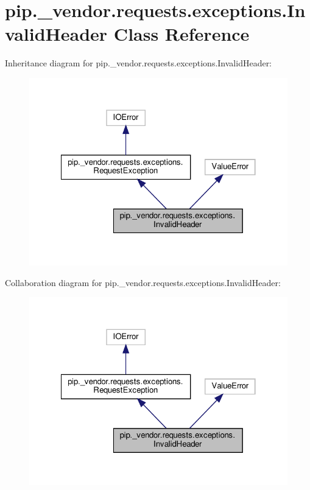 \hypertarget{classpip_1_1__vendor_1_1requests_1_1exceptions_1_1InvalidHeader}{}\section{pip.\+\_\+vendor.\+requests.\+exceptions.\+Invalid\+Header Class Reference}
\label{classpip_1_1__vendor_1_1requests_1_1exceptions_1_1InvalidHeader}


Inheritance diagram for pip.\+\_\+vendor.\+requests.\+exceptions.\+Invalid\+Header\+:
\nopagebreak
\begin{figure}[H]
\begin{center}
\leavevmode
\includegraphics[width=322pt]{classpip_1_1__vendor_1_1requests_1_1exceptions_1_1InvalidHeader__inherit__graph}
\end{center}
\end{figure}


Collaboration diagram for pip.\+\_\+vendor.\+requests.\+exceptions.\+Invalid\+Header\+:
\nopagebreak
\begin{figure}[H]
\begin{center}
\leavevmode
\includegraphics[width=322pt]{classpip_1_1__vendor_1_1requests_1_1exceptions_1_1InvalidHeader__coll__graph}
\end{center}
\end{figure}
